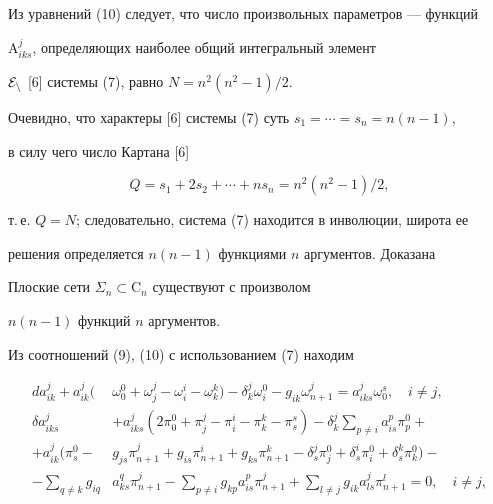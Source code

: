 Из уравнений (10) следует, что число произвольных параметров --- функций 


$\mathrm A^j_{iks}$, определяющих наиболее общий интегральный элемент 


$\cal E_n$ [6] системы (7), равно $N=n^2(n^2-1)/2$. 


 


Очевидно, что характеры [6] системы (7) суть $s_1=\dotsb=s_n=n(n-1)$, 


в силу чего число Картана [6] 


$$ 


Q=s_1+2s_2+\dotsb+ns_n=n^2(n^2-1)/2, 


$$ 


т.\,е. $Q=N$; следовательно, система (7) находится в инволюции, широта ее 


решения определяется $n(n-1)$ функциями $n$ аргументов. Доказана 


 


\begin{thm} 


Плоские сети $\Sigma_n\subset\mathrm C_n$ существуют с произволом 


$n(n-1)$ функций $n$ аргументов. 


\end{thm} 


 


 


Из соотношений (9), (10) с использованием (7) находим 


\begin{equation}


\begin{split} 


da^j_{ik}+a^j_{ik}(&\omega^0_0+\omega^j_j-\omega^i_i- 


\omega^k_k)-\delta^j_k\omega_i^0- 


g_{ik}\omega^j_{n+1}=a^j_{iks}\omega^s_0,\quad i\ne j,\\ 


% 


\delta a^j_{iks}&+a^j_{iks}(2\pi^0_0+\pi^j_j-\pi^i_i- 


\pi^k_k-\pi^s_s)-\delta^j_k\sum_{p\ne i}a^p_{is}\pi^0_p+\\ 


% 


+a^j_{ik}(\pi^0_s-&g_{js}\pi^j_{n+1}+g_{is}\pi^i_{n+1}+ 


g_{ks}\pi^k_{n+1}-\delta^j_s\pi^0_j+\delta^i_s\pi^0_i+ 


\delta^k_s\pi^0_k)-\\ 


-\sum_{q\ne k}g_{iq}&a^q_{ks}\pi^j_{n+1}-\sum_{p\ne i} 


g_{kp}a^p_{is}\pi^j_{n+1}+\sum_{l\ne j} 


g_{ik}a^j_{ls}\pi^l_{n+1}=0,\quad i\ne j, 


\end{split} 


\end{equation}


